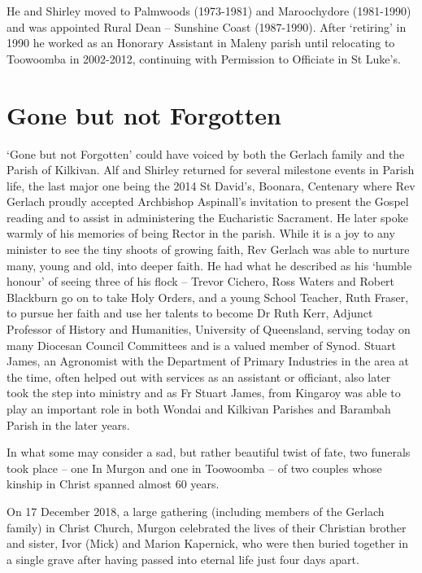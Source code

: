 He and Shirley moved to Palmwoods (1973-1981) and Maroochydore (1981-1990) and was appointed Rural Dean -- Sunshine Coast (1987-1990). After `retiring' in 1990 he worked as an Honorary Assistant in Maleny parish until relocating to Toowoomba in 2002-2012, continuing with Permission to Officiate in St Luke's.

\hypertarget{gone-but-not-forgotten}{%
\section{Gone but not Forgotten}\label{gone-but-not-forgotten}}

`Gone but not Forgotten' could have voiced by both the Gerlach family and the Parish of Kilkivan. Alf and Shirley returned for several milestone events in Parish life, the last major one being the 2014 St David's, Boonara, Centenary where Rev Gerlach proudly accepted Archbishop Aspinall's invitation to present the Gospel reading and to assist in administering the Eucharistic Sacrament. He later spoke warmly of his memories of being Rector in the parish. While it is a joy to any minister to see the tiny shoots of growing faith, Rev Gerlach was able to nurture many, young and old, into deeper faith. He had what he described as his `humble honour' of seeing three of his flock -- Trevor Cichero, Ross Waters and Robert Blackburn go on to take Holy Orders, and a young School Teacher, Ruth Fraser, to pursue her faith and use her talents to become Dr Ruth Kerr, Adjunct Professor of History and Humanities, University of Queensland, serving today on many Diocesan Council Committees and is a valued member of Synod. Stuart James, an Agronomist with the Department of Primary Industries in the area at the time, often helped out with services as an assistant or officiant, also later took the step into ministry and as Fr Stuart James, from Kingaroy was able to play an important role in both Wondai and Kilkivan Parishes and Barambah Parish in the later years.

In what some may consider a sad, but rather beautiful twist of fate, two funerals took place -- one In Murgon and one in Toowoomba -- of two couples whose kinship in Christ spanned almost 60 years.

On 17 December 2018, a large gathering (including members of the Gerlach family) in Christ Church, Murgon celebrated the lives of their Christian brother and sister, Ivor (Mick) and Marion Kapernick, who were then buried together in a single grave after having passed into eternal life just four days apart.

